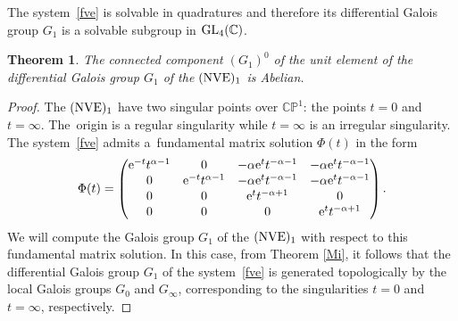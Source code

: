 \documentclass[pdftex]{sigma}
\numberwithin{equation}{section}
\newtheorem{Theorem}{Theorem}[section]
\begin{document}
 The system~\eqref{fve} is solvable in quadratures and therefore its differential Galois group $G_1$ is a solvable subgroup
 in ${\rm GL}_4(\mathbb{C})$.

 \begin{Theorem}%
 The connected component $(G_1)^0$ of the unit element of the differential Galois group $G_1$ of the $({\rm NVE})_1$ is Abelian.
 \end{Theorem}


 \begin{proof}

 The $({\rm NVE})_1$ have two singular points over $\mathbb{C}\mathbb{P}^1$: the points $t=0$ and $t=\infty$. The~origin is a regular singularity while $t=\infty$ is an irregular singularity.
 The system~\eqref{fve} admits a~fundamental matrix solution $\Phi(t)$ in the form
 \[
 \Phi(t)=\begin{pmatrix}
 {\rm e}^{-t} t^{\alpha-1} & 0 & -\alpha {\rm e}^t t^{-\alpha-1} & -\alpha {\rm e}^t t^{-\alpha-1}\\[0.1ex]
 0 & {\rm e}^{-t} t^{\alpha-1} & -\alpha {\rm e}^t t^{-\alpha-1} & -\alpha {\rm e}^t t^{-\alpha-1}\\[0.1ex]
 0 & 0 & {\rm e}^t t^{-\alpha+1} & 0\\[0.1ex]
 0 & 0 & 0 & {\rm e}^t t^{-\alpha+1}
 \end{pmatrix}.
 \]
 We will compute the Galois group $G_1$ of the $({\rm NVE})_1$ with respect to this fundamental matrix solution.
 In this case, from Theorem \ref{Mi}, it follows that
 the differential Galois group $G_1$ of the system~\eqref{fve} is generated topologically by the local Galois groups $G_0$ and $G_{\infty}$, corresponding to the singularities $t=0$ and $t=\infty$, respectively.


\end{proof}
\end{document}
